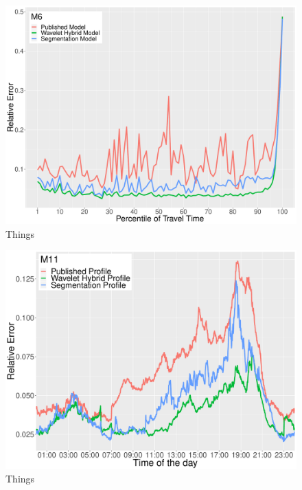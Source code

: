 \documentclass[letterpaper, 10 pt, conference]{ieeeconf}  %
\begin{document}
\begin{figure}[htbp]
	\centerline{\includegraphics[width=\linewidth]{./images/m6_quantile_rms.pdf}}
	\caption{Things}
	\label{fig:m6q}
\end{figure}

\begin{figure}[htbp]
	\centerline{\includegraphics[width=\linewidth]{./images/m11_daytime.pdf}}
	\caption{Things}
	\label{fig:m11dt}
\end{figure}
\end{document}
